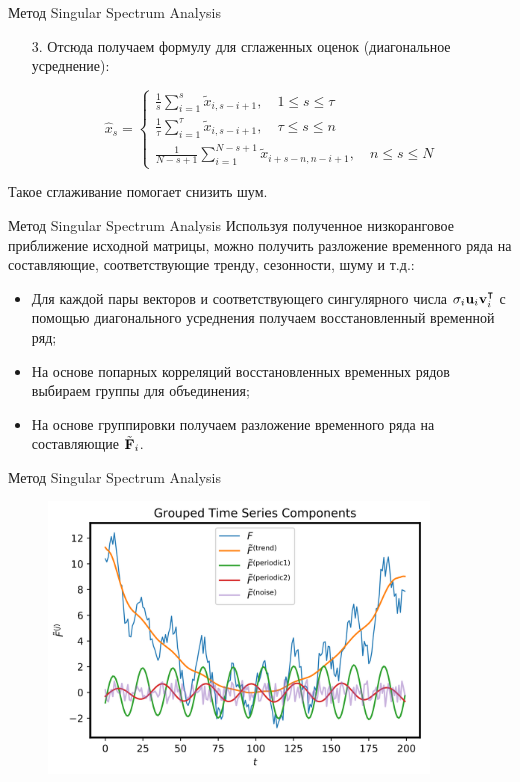 \begin{frame}{Метод Singular Spectrum Analysis}
    \begin{enumerate}
        \item[3.] Отсюда получаем формулу для сглаженных оценок (диагональное усреднение):

$$
\hat{x}_s = 
\begin{cases}
\displaystyle\frac{1}{s} \sum_{i=1}^s \tilde{x}_{i, s-i+1}, \quad 1 \leq s \leq \tau \\
\displaystyle\frac{1}{\tau} \sum_{i=1}^{\tau} \tilde{x}_{i, s-i+1}, \quad \tau \leq s \leq n\\
\displaystyle\frac{1}{N-s+1} \sum_{i=1}^{N-s+1} \tilde{x}_{i + s - n, n-i+1}, \quad n \leq s \leq N
\end{cases}
$$
    \end{enumerate}

    Такое сглаживание помогает снизить шум.
    
\end{frame}
\begin{frame}{Метод Singular Spectrum Analysis}
Используя полученное низкоранговое приближение исходной матрицы, можно получить разложение временного ряда на составляющие, соответствующие тренду, сезонности, шуму и т.д.:\\

\begin{itemize}
    \item Для каждой пары векторов и соответствующего сингулярного числа $\sigma_i \textbf{u}_i \textbf{v}_i^\intercal$ с помощью диагонального усреднения получаем восстановленный временной ряд;
    \item На основе попарных корреляций восстановленных временных рядов выбираем группы для объединения;          
    \item На основе группировки получаем разложение временного ряда на составляющие $\tilde{\textbf{F}}_i$.
\end{itemize}
  
\end{frame}
\begin{frame}{Метод Singular Spectrum Analysis}
\begin{figure}
    \centering
    \includegraphics[width=0.9\textwidth]{lecture_14/figs/group_time_series.png}
\end{figure}
  
\end{frame}
